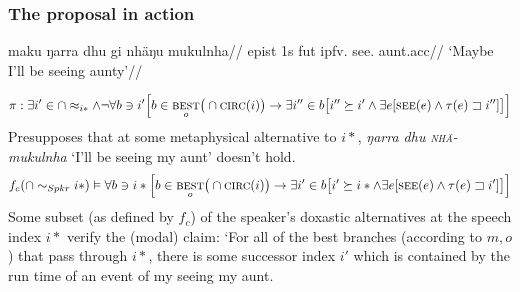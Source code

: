 	\iffalse
		The entries i had in the FoDS talk (definitely don't get it right):
		
		
		\textbf{II} as modal-for-the-present
		
		
		$$\llbracket \textbf{II}(\varphi)\rrbracket^{w,t*,\textbf{\textsc{mb}}}\leftrightarrow\forall w^\prime\in \textsc{\textbf{mb}}(w,t*)[t*\preceq t^\prime\wedge\varphi(w^\prime,t^\prime)] $$
		\textit{$ \varphi $ holds at or after speech time in all worlds that are \textbf{mb-}accessible from $ w $}
		
		\textbf{IV} as modal-for-the-past
		
		
		$$\llbracket\textbf{IV}(\varphi)\rrbracket^{w,t*,\textbf{\textsc{mb}}}\leftrightarrow\forall w^\prime\in \textsc{\textbf{mb}}(w,t*)[t*\succ t^\prime\wedge\varphi(w^\prime,t^\prime)] $$
		\textit{$ \varphi $ holds before speech time in all worlds that are \textbf{mb-}accessible from $ w $}
	\fi

\subsubsection{The proposal in action}

\pex\begingl\gla maku ŋarra dhu gi nhäŋu mukulnha//
\glb \gls{epist} 1s \gls{fut} \gls{ipfv}.\II{} see.\II{} aunt.\gls{acc}//
\glft `Maybe I'll be seeing aunty'//\endgl\


{\small$$ \pi:\exists i'\in\cap\approx_{i*}\wedge\neg\forall b\ni i'\Big[b\in\underset{o}{\textsc{best}}\big(\cap\textsc{circ}(i)\big)\to\exists i''\in b\big[i''\succeq i'\wedge\exists e[\textsc{see}(e)\wedge\tau(e)\sqsupset i'']\big]\Big] $$}
Presupposes that at some metaphysical alternative to $ i* $, \textit{ŋarra dhu \textsc{nhä-} mukulnha} `I'll be seeing my aunt' doesn't hold.
$$ f_c(\cap\sim_{Spkr}i*)\vDash\forall b\ni i*\Big[b\in\underset{o}{\textsc{best}}\big(\cap\textsc{circ}(i)\big)\to\exists i'\in b\big[i'\succeq i*\wedge\exists e[\textsc{see}(e)\wedge\tau(e)\sqsupset i']\big]\Big] $$
Some subset (as defined by $ f_c $) of the speaker's doxastic alternatives at the speech index $ i* $ verify the (modal) claim: `For all of the best branches (according to $ m,o $) that pass through $ i* $, there is some successor index $ i' $ which is contained by the run time of an event of my seeing my aunt.


